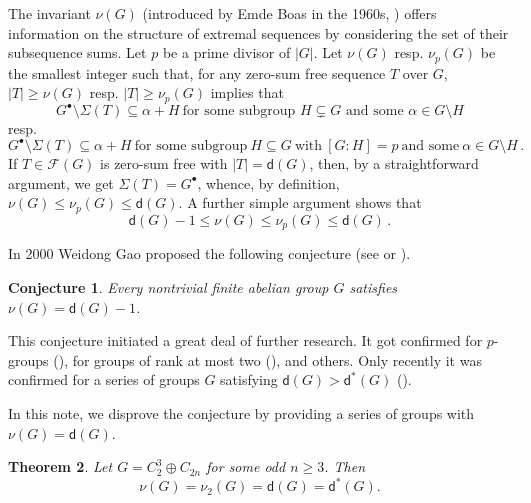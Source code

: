 \documentclass[11pt,a4paper]{amsart}
\theoremstyle{plain}
\newtheorem{theorem}{\bf Theorem}[section]
\newtheorem{conjecture}[theorem]{\bf Conjecture}
\theoremstyle{definition}
\newcommand{\dd}{\mathsf d}
\begin{document}
The invariant $\nu (G)$ (introduced by Emde Boas in the 1960s, \cite{Em69a}) offers information on the structure of extremal sequences by considering the set of their subsequence sums. Let $p$ be a prime divisor of $|G|$. Let $\nu (G)$ resp. $\nu_p (G)$ be the smallest integer such that, for any zero-sum free sequence $T$ over $G$, $|T| \ge \nu (G)$ resp. $|T| \ge \nu_p (G)$ implies that
\begin{equation} \label{def-nu(G)}
G^{\bullet} \setminus \Sigma (T) \subseteq \alpha+H \ \mbox {for some  subgroup $H  \subsetneq G$ and some $\alpha\in G\setminus H$}
\end{equation}
resp.
\begin{equation} \label{def-nu_p(G)}
G^{\bullet} \setminus \Sigma (T) \subseteq \alpha + H \ \text{for some subgroup} \ H \subseteq G \ \text{with} \ [G \colon H] = p \ \text{and some} \ \alpha \in G \setminus H \,.
\end{equation}
If $T \in \mathcal F (G)$ is zero-sum free with $|T|=\mathsf d(G)$, then, by a straightforward argument, we get $\Sigma (T) = G^{\bullet}$, whence, by definition, $\nu (G) \le \nu_p (G) \le \mathsf d (G)$. A further simple argument shows that
\begin{equation} \label{basic-inequ-2}
\mathsf d (G) -1 \le \nu (G) \le \nu_p (G) \le \mathsf d (G) \,.
\end{equation}



In 2000 Weidong Gao proposed the following conjecture (see \cite[Section~3]{Ga00b} or \cite[Conjecture~4.10]{Ga-Ge06b}).
\begin{conjecture} \label{conj:gao}
Every nontrivial finite abelian group $G$ satisfies $\nu(G)=\dd(G)-1$.
\end{conjecture}


This conjecture initiated a great deal of  further research. It got confirmed for $p$-groups (\cite[Theorem 5.5.9]{Ge-HK06a}), for  groups of rank at most two (\cite[Theorem 3.4.11]{Ge-Gr-Zh26a}), and others. Only recently it was confirmed for a series of groups $G$ satisfying $\mathsf d (G) > \mathsf d^* (G)$ (\cite{Ge-Ya27a}).


In this note, we disprove the conjecture by providing a series of groups with $\nu (G) = \mathsf d (G)$.

\begin{theorem}\label{thm:main1}
Let $G=C_2^3\oplus C_{2n}$ for some odd $n\geq 3$. Then $$\nu(G)=\nu_2 (G)=\dd(G)=\mathsf d^* (G).$$
\end{theorem}
\end{document}
